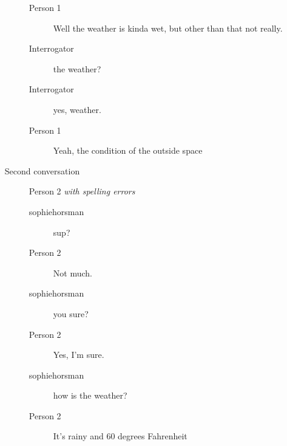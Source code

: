 \begin{itemize}
\begin{description}
\begin{description}
               \item [Person 1] Well the weather is kinda wet, but other than that not really.
               \item [Interrogator] the weather?
               \item [Interrogator] yes, weather.
               \item [Person 1] Yeah, the condition of the outside space
            \end{description}
         \item [Second conversation] Person 2 \textit{with spelling errors}
            \begin{description}
               \item [sophiehorsman] sup?
               \item [Person 2] Not much.
               \item [sophiehorsman] you sure?
               \item [Person 2] Yes, I’m sure.
               \item [sophiehorsman] how is the weather?
               \item [Person 2] It's rainy and 60 degrees Fahrenheit
            \end{description}
      \end{description}


\end{itemize}
